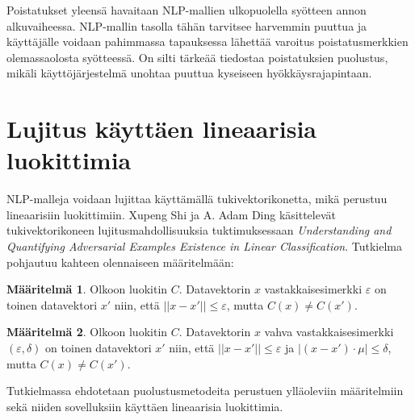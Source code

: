 Poistatukset yleensä havaitaan NLP-mallien ulkopuolella syötteen annon alkuvaiheessa. NLP-mallin tasolla tähän tarvitsee harvemmin puuttua ja käyttäjälle voidaan pahimmassa tapauksessa lähettää varoitus poistatusmerkkien olemassaolosta syötteessä. On silti tärkeää tiedostaa poistatuksien puolustus, mikäli käyttöjärjestelmä unohtaa puuttua kyseiseen hyökkäysrajapintaan. \citep{boucher2021bad}

\section{Lujitus käyttäen lineaarisia luokittimia}
NLP-malleja voidaan lujittaa käyttämällä tukivektorikonetta, mikä perustuu lineaarisiin luokittimiin. Xupeng Shi ja A. Adam Ding käsittelevät tukivektorikoneen lujitusmahdollisuuksia tuktimuksessaan \textit{Understanding and Quantifying Adversarial Examples Existence in Linear Classification}. Tutkielma pohjautuu kahteen olennaiseen määritelmään:

\theoremstyle{definition}
\newtheorem{definition}{Määritelmä}

\begin{definition}
  Olkoon luokitin $C$. Datavektorin $x$ vastakkaisesimerkki $\varepsilon$ on toinen datavektori $x'$ niin, että $||x-x'||\leq \varepsilon$, mutta $C(x) \not = C(x')$.
\end{definition}

\begin{definition}
  Olkoon luokitin $C$. Datavektorin $x$ vahva vastakkaisesimerkki $(\varepsilon, \delta)$ on toinen datavektori $x'$ niin, että $||x-x'||\leq \varepsilon$ ja $|(x-x')\cdot \mu|\leq\delta$, mutta $C(x) \not = C(x')$.
\end{definition}

Tutkielmassa ehdotetaan puolustusmetodeita perustuen ylläoleviin määritelmiin sekä niiden sovelluksiin käyttäen lineaarisia luokittimia.